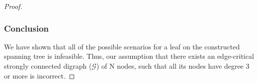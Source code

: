 \documentclass[runningheads]{llncs}
\begin{document}
\begin{proof}

\subsubsection{Conclusion} We have shown that all of the possible scenarios for a leaf on the constructed spanning tree is infeasible. Thus, our assumption that there exists an edge-critical strongly connected digraph ($\mathcal{G}$) of N nodes, such that all its nodes have degree 3 or more is incorrect.
\end{proof}
\end{document}

